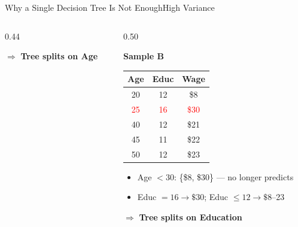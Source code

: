 \documentclass[hyperref={pdfpagelabels=false}]{beamer}
\begin{document}
\begin{frame}{Why a Single Decision Tree Is Not Enough}{High Variance}
\begin{columns}[T]
\begin{column}{0.44\textwidth}
\begin{itemize}
  \end{itemize}
      \vspace{0.1cm}
  $\Rightarrow$ \textbf{Tree splits on Age}
\end{column}
\hfill
\begin{column}{0.50\textwidth}
  \begin{center}\textbf{Sample B}\end{center}
  \begin{center}\small
  \begin{tabular}{@{}ccc@{}}
    \toprule
    Age & Educ & Wage \\
    \midrule
    20                   & 12                   & \$8                  \\
    \textcolor{red}{25}  & \textcolor{red}{16}  & \textcolor{red}{\$30}\\
    40                   & 12                   & \$21                 \\
    45                   & 11                   & \$22                 \\
    50                   & 12                   & \$23                 \\
    \bottomrule
  \end{tabular}
  \end{center}
  \begin{itemize}\small
    \item Age $<30$: \{\$8, \$30\} --- no longer predicts
      \vspace{0.1cm}
    \item Educ $=16\to\$30$; Educ $\leq12\to\$8$--23
  \end{itemize}
  \vspace{0.1cm}
  $\Rightarrow$ \textbf{Tree splits on Education}
\end{column}
\end{columns}
\end{frame}
\end{document}
